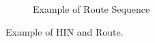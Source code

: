 \documentclass[]{article}
\begin{document}
\begin{figure}[!htbp]
\begin{subfigure}[b]{0.45\textwidth}
		\caption{Example of Route Sequence}
		\label{fig1:image2}
	\end{subfigure}
	\caption{Example of HIN and Route.}
	\label{fig1}
\end{figure}

\end{document}
